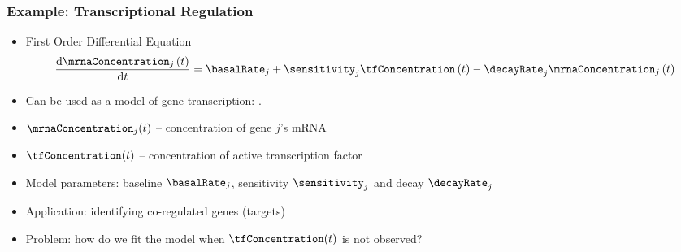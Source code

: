 \begin{frame}
  \frametitle{Example: Transcriptional Regulation}
  \begin{itemize}
  \item <1->First Order Differential Equation \[
    \frac{\text{d}\mrnaConcentration_{j}\left(t\right)}{\text{d}t}=\basalRate_{j}+\sensitivity_{j}\tfConcentration\left(t\right)-\decayRate_{j}\mrnaConcentration_{j}\left(t\right)\]

  \item <2->Can be used as a model of gene transcription: \citealp{Barenco:ranked06,Gao:latent08}.
  \item <3->$\mrnaConcentration_{j}(t)$ -- concentration of gene $j$'s mRNA 
  \item <4->$\tfConcentration(t)$ -- concentration of active transcription factor 
  \item <5->Model parameters: baseline $\basalRate_{j}$, sensitivity $\sensitivity_{j}$ and
    decay $\decayRate_{j}$ 
  \item <6->Application: identifying co-regulated genes (targets) 
  \item <7->Problem: how do we fit the model when $\tfConcentration(t)$ is not observed?
  \end{itemize}
\end{frame}

